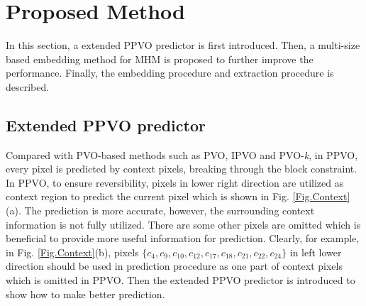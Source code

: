 \documentclass[review,3p,10pt,sort&compress]{elsarticle}
\begin{document}
\section{Proposed Method}\label{sec:3}
In this section, a extended PPVO predictor is first introduced. Then, a multi-size based embedding method for MHM is proposed to further improve the performance. Finally, the embedding procedure and extraction procedure is described.

\subsection{Extended PPVO predictor}\label{sec:3.1}
Compared with PVO-based methods such as PVO\cite{Li2013PVO}, IPVO\cite{Peng2014IPVO} and PVO-\emph{k}\cite{Ou2014PVOk}, in PPVO, every pixel is predicted by context pixels, breaking through the block constraint. In PPVO, to ensure reversibility, pixels in lower right direction are utilized as context region to predict the current pixel which is shown in Fig. \ref{Fig.Context}(a). The prediction is more accurate, however, the surrounding context information is not fully utilized. There are some other pixels are omitted which is beneficial to provide more useful information for prediction. Clearly, for example, in Fig. \ref{Fig.Context}(b), pixels $\{c_{4}, c_{9}, c_{10}, c_{12}, c_{17}, c_{18}, c_{21}, c_{22}, c_{24}\}$ in left lower direction should be used in prediction procedure as one part of context pixels which is omitted in PPVO. Then the extended PPVO predictor is introduced to show how to make better prediction.
\end{document}
